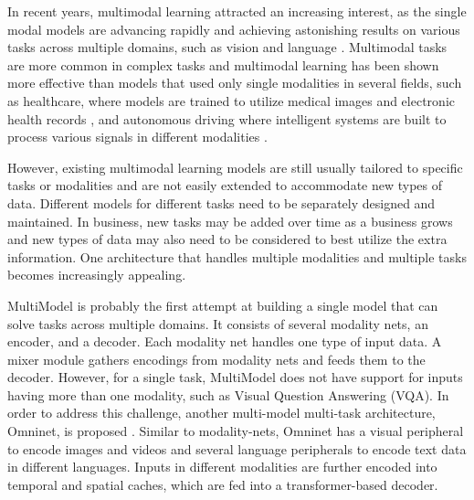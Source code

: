 \documentclass{article}
\begin{document}
In recent years, multimodal learning attracted an increasing interest, as the single modal models are advancing rapidly and achieving astonishing results on various tasks across multiple domains, such as vision \cite{dosovitskiy2020image} and language \cite{devlin2018bert}. Multimodal tasks are more common in complex tasks and multimodal learning has been shown more effective than models that used only single modalities in several fields, such as healthcare, where models are trained to utilize medical images and electronic health records \cite{huang2020fusion,li2021multimodal}, and autonomous driving where intelligent systems are built to process various signals in different modalities \cite{feng2020deep,prakash2021multi}.

However, existing multimodal learning models are still usually tailored to specific tasks or modalities and are not easily extended to accommodate new types of data. Different models for different tasks need to be separately designed and maintained. In business, new tasks may be added over time as a business grows and new types of data may also need to be considered to best utilize the extra information. One architecture that handles multiple modalities and multiple tasks becomes increasingly appealing.

MultiModel \cite{kaiser2017one} is probably the first attempt at building a single model that can solve tasks across multiple domains. It consists of several modality nets, an encoder, and a decoder. Each modality net handles one type of input data. A mixer module gathers encodings from modality nets and feeds them to the decoder. However, for a single task, MultiModel does not have support for inputs having more than one modality, such as Visual Question Answering (VQA). In order to address this challenge, another multi-model multi-task architecture, Omninet, is proposed \cite{pramanik2019omninet}. Similar to modality-nets, Omninet has a visual peripheral to encode images and videos and several language peripherals to encode text data in different languages. Inputs in different modalities are further encoded into temporal and spatial caches, which are fed into a transformer-based decoder. 
\end{document}
